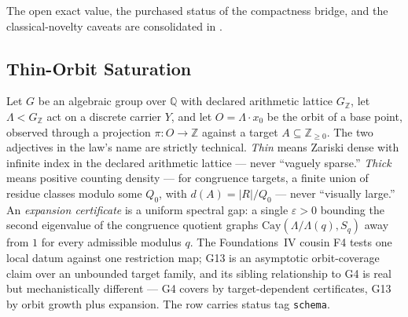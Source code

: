 \documentclass[11pt]{article}
\newcommand{\lawGThirteen}{Thin-Orbit Saturation}
\theoremstyle{definition}
\begin{document}
The open exact value, the purchased status of the compactness bridge, and the classical-novelty
caveats are consolidated in .

\subsection{\lawGThirteen}\label{sec:clusterD:g13}

Let $G$ be an algebraic group over $\mathbb{Q}$ with declared arithmetic lattice $G_{\mathbb{Z}}$,
let $\Lambda < G_{\mathbb{Z}}$ act on a discrete carrier $Y$, and let $O = \Lambda \cdot x_0$ be the
orbit of a base point, observed through a projection $\pi : O \to \mathbb{Z}$ against a target
$A \subseteq \mathbb{Z}_{\ge 0}$. The two adjectives in the law's name are strictly technical.
\emph{Thin} means Zariski dense with infinite index in the declared arithmetic lattice --- never
``vaguely sparse.'' \emph{Thick} means positive counting density --- for congruence targets, a finite
union of residue classes modulo some $Q_0$, with $d(A) = |R|/Q_0$ --- never ``visually large.'' An
\emph{expansion certificate} is a uniform spectral gap: a single $\varepsilon > 0$ bounding the
second eigenvalue of the congruence quotient graphs $\mathrm{Cay}(\Lambda/\Lambda(q), S_q)$ away from
$1$ for every admissible modulus $q$. The Foundations~IV cousin F4 tests one local datum against one
restriction map; G13 is an asymptotic orbit-coverage claim over an unbounded target family, and its
sibling relationship to G4 is real but mechanistically different --- G4 covers by target-dependent
certificates, G13 by orbit growth plus expansion. The row carries status tag \texttt{schema}.
\end{document}
